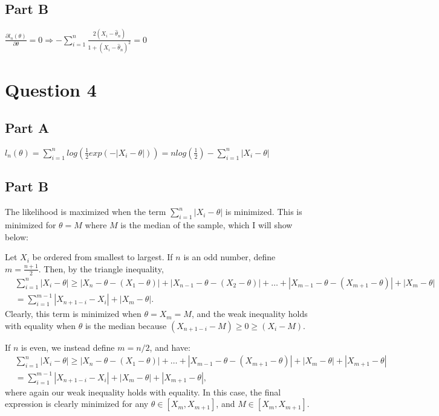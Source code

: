 \documentclass[11pt]{article} %
\begin{document}
\subsection{Part B}
$\frac{\partial l_n(\theta)}{\partial \theta} = 0 \Rightarrow -\sum_{i=1}^n \frac{2(X_i - \hat{\theta}_n)}{1 +(X_i- \hat{\theta}_n)^2 } = 0$
\section{Question 4} %
\subsection{Part A}
$l_n(\theta) = \sum_{i=1}^n log(\frac{1}{2} exp(-|X_i-\theta|)) = n log(\frac{1}{2})  -\sum_{i=1}^n |X_i-\theta|$
\subsection{Part B}
The likelihood is maximized when the term $\sum_{i=1}^n |X_i-\theta|$ is minimized. This is minimized for $\theta = M$ where $M$ is the median of the sample, which I will show below:

Let $X_i$ be ordered from smallest to largest. If $n$ is an odd number, define $m = \frac{n+1}{2}$. Then, by the triangle inequality,
\begin{align*}
&\sum_{i=1}^{n}|X_i - \theta| \geq |X_n - \theta - (X_1 - \theta)| + |X_{n-1} - \theta - (X_2 - \theta)| + \dots + |X_{m-1} - \theta - (X_{m+1} - \theta)| + |X_{m} - \theta| \\&= \sum_{i=1}^{m-1} |X_{n+1-i} - X_i| + |X_m - \theta|.
\end{align*}
Clearly, this term is minimized when $\theta=X_m = M$, and the weak inequality holds with equality when $\theta$ is the median because $(X_{n+1-i} - M)\geq 0 \geq( X_i - M)$.

If $n$ is even, we instead define $m=n/2$, and have:
\begin{align*}
&\sum_{i=1}^{n}|X_i - \theta| \geq |X_n - \theta - (X_1 - \theta)| + \dots + |X_{m-1} - \theta - (X_{m+1} - \theta)| + |X_{m} - \theta| +  |X_{m+1} - \theta| \\&= \sum_{i=1}^{m-1} |X_{n+1-i} - X_i| + |X_m - \theta| + |X_{m+1} - \theta|,
\end{align*}
where again our weak inequality holds with equality. In this case, the final expression is clearly minimized for any $\theta \in [X_m,X_{m+1}]$, and $M\in [X_m,X_{m+1}]$.
\end{document}
